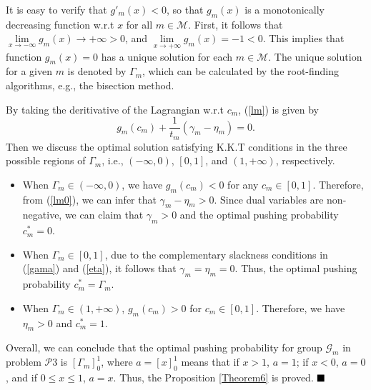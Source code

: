 \documentclass[12pt, draftclsnofoot, onecolumn]{IEEEtran}
\begin{document}
It is easy to verify that $g'_m(x) <0$, so that $g_m(x)$ is a monotonically decreasing function w.r.t $x$ for all $m \in \mathcal{M}$.
First, it follows that $\lim\limits_{x \to -\infty}g_m(x) \to +\infty >0$, and $\lim\limits_{x \to +\infty}g_m(x) = -1 <0$. This implies that function $g_m(x)=0$ has a unique solution for each $m \in \mathcal{M}$. The unique solution for a given $m$ is denoted by $\Gamma_m$, which can be calculated by the root-finding algorithms, e.g., the bisection method.

By taking the deritivative of the Lagrangian w.r.t $c_m$, (\ref {lm}) is given by
\begin{equation}
g_m(c_m) + \frac{1}{t_m}(\gamma_m - \eta_m) =0 \label{lm0}.
\end{equation}
Then we discuss the optimal solution satisfying K.K.T conditions in the three possible regions of $\Gamma_m$, i.e., $(-\infty,0)$, $[0,1]$, and $(1,+\infty)$, respectively.

\begin{itemize}
\item When $\Gamma_m \in (-\infty,0)$, we have $g_m(c_m) < 0$ for any $c_m \in [0,1]$.  Therefore, from (\ref{lm0}), we can infer that  $\gamma_m - \eta_m >0$. Since dual variables are non-negative, we can claim that $\gamma_m >0$ and the optimal pushing probability $c_m^{\ast}=0$.

\item When $\Gamma_m \in [0,1]$, due to the complementary slackness conditions in (\ref{gama}) and (\ref{eta}), it follows that $\gamma_m=\eta_m =0$. Thus, the optimal pushing probability $c_m^{\ast}= \Gamma_m$.

\item When $\Gamma_m \in (1,+\infty)$, $g_m(c_m) > 0$ for $c_m \in [0,1]$. Therefore, we have $\eta_m >0$ and $c_m^{\ast}=1$.
\end{itemize}

Overall, we can conclude that the optimal pushing probability for group $\mathcal{G}_m$ in problem $\mathcal{P}3$ is $[\Gamma_m]^1_0$, where $a=[x]^1_0$ means that if $x>1$, $a=1$; if $x<0$, $a=0$, and if $0\leq x \leq 1$, $a=x$. Thus, the Proposition \ref{Theorem6} is proved.
$\hfill\blacksquare$





\end{document}
